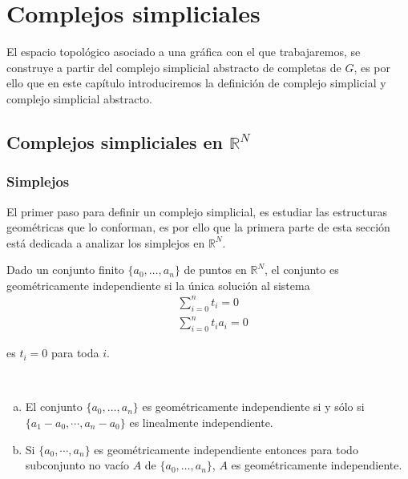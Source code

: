 \chapter{Complejos simpliciales}
El espacio topológico asociado a una gráfica con el que trabajaremos, se construye a partir del complejo simplicial abstracto de completas de $G$, es por ello que en este capítulo introduciremos la definición de complejo simplicial y complejo simplicial abstracto.
\section{Complejos simpliciales en $\mathbb{R}^N$}
\subsection{Simplejos}  
El primer paso para definir un complejo simplicial, es estudiar las estructuras geométricas que lo conforman, es por ello que la primera parte de esta sección está dedicada a analizar los simplejos en $\mathbb{R}^N$.           
\begin{Defi}
Dado un conjunto finito $\{a_0,\ldots,a_n\}$ de puntos en $\mathbb{R}^{N}$, el conjunto es geométricamente independiente si la única solución al sistema 
\begin{equation}\label{s1}
    \begin{split}
     &\sum_{i=0}^{n}t_{i} = 0 \\
     &\sum_{i=0}^{n}t_{i}a_{i} = 0   
    \end{split}
\end{equation}

es $t_i = 0$ para toda $i$.
\end{Defi}

\begin{Teo}
~\begin{enumerate}[(a)]
    \item El conjunto $\{a_0,\ldots,a_n\}$ es geométricamente independiente si y sólo si $\{a_1-a_0,\cdots,a_n-a_0\}$ es linealmente independiente.
    \item Si $\{a_0,\cdots,a_n\}$ es geométricamente independiente entonces para todo subconjunto no vacío $A$ de $\{a_0,\ldots,a_n\}$, $A$ es geométricamente independiente.
\end{enumerate}
\end{Teo}

